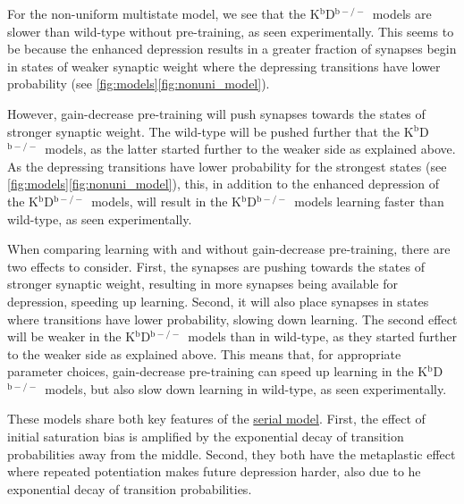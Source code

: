 \documentclass[10pt]{article}
\newcommand{\KO}{K$^\mathrm{b}$D$^{\mathrm{b}-/-}$}
\begin{document}
For the non-uniform multistate model, we see that the \KO\ models are slower than wild-type without pre-training, as seen experimentally.
This seems to be because the enhanced depression results in a greater fraction of synapses begin in states of weaker synaptic weight %
where the depressing transitions have lower probability (see \autoref{fig:models}\ref{fig:nonuni_model}).

However, gain-decrease pre-training will push synapses towards the states of stronger synaptic weight.
The wild-type will be pushed further that the \KO\ models, as the latter started further to the weaker side as explained above. %
As the depressing transitions have lower probability for the strongest states (see \autoref{fig:models}\ref{fig:nonuni_model}), this, in addition to the enhanced depression of the \KO\ models, will result in the \KO\ models learning faster than wild-type, as seen experimentally.

When comparing learning with and without gain-decrease pre-training, there are two effects to consider.
First, the synapses are pushing towards the states of stronger synaptic weight, resulting in more synapses being available for depression, speeding up learning.
Second, it will also place synapses in states where transitions have lower probability, slowing down learning.
The second effect will be weaker in the \KO\ models than in wild-type, as they started further to the weaker side as explained above.
This means that, for appropriate parameter choices, gain-decrease pre-training can speed up learning in the \KO\ models, but also slow down learning in wild-type, as seen experimentally.

These models share both key features of the \hyperref[sec:multistate]{serial model}.
First, the effect of initial saturation bias is amplified by the exponential decay of transition probabilities away from the middle.
Second, they both have the metaplastic effect where repeated potentiation makes future depression harder, also due to he exponential decay of transition probabilities.
\end{document}
